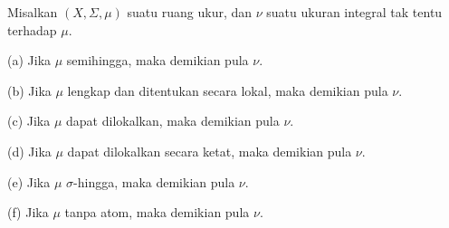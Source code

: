 

Misalkan $(X,\Sigma,\mu)$ suatu ruang ukur, dan
$\nu$ suatu ukuran integral tak tentu terhadap $\mu$.

(a) Jika $\mu$ semihingga, maka demikian pula $\nu$.

(b) Jika $\mu$ lengkap dan ditentukan secara lokal, maka demikian pula
$\nu$.

(c) Jika $\mu$ dapat dilokalkan, maka demikian pula $\nu$.

(d) Jika $\mu$ dapat dilokalkan secara ketat, maka demikian pula $\nu$.

(e) Jika $\mu$ $\sigma$-hingga, maka demikian pula $\nu$.

(f) Jika $\mu$ tanpa atom, maka demikian pula $\nu$.

